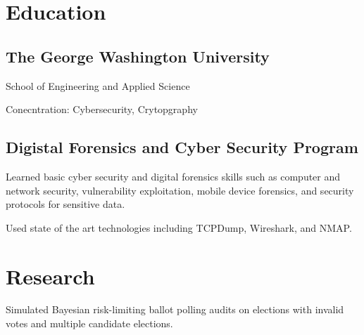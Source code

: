 \documentclass[]{deedy-resume-openfont}
\begin{document}
\begin{minipage}[t]{0.66\textwidth}



        \section{Education}
        \subsection{The George Washington University}
        School of Engineering and Applied Science\\
        \vspace{\topsep}
        \begin{tightemize}
        \item Conecntration: Cybersecurity, Crytopgraphy
        \end{tightemize}
        \sectionsep

        \subsection{Digistal Forensics and Cyber Security Program}
        \vspace{\topsep}
        \begin{tightemize}
        \item Learned basic cyber security and digital forensics skills such as computer and network security, vulnerability exploitation, mobile device forensics, and security protocols for sensitive data.
        \item Used state of the art technologies including TCPDump, Wireshark, and NMAP.
        \end{tightemize}



        \section{Research}
        \sectionsep
        Simulated Bayesian risk-limiting ballot polling audits on elections with invalid votes and multiple candidate elections.


\end{minipage}
\end{document}
